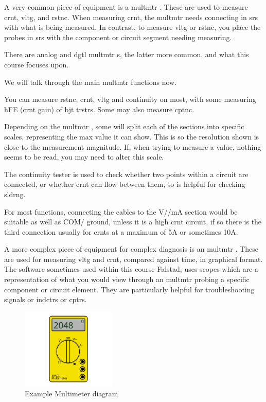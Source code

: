 \documentclass[a4paper,11pt]{report}
\begin{document}
A very common piece of equipment is a \gls{multmtr} . These are used to measure \gls{crnt}, \gls{vltg}, and \gls{rstnc}. When measuring \gls{crnt}, the \gls{multmtr}  needs connecting in \gls{srs} with what is being measured. In contrast, to measure \gls{vltg} or \gls{rstnc}, you place the probes in \gls{srs} with the component or circuit segment needing measuring.

There are analog and \gls{dgtl} \gls{multmtr} s, the latter more common, and what this course focuses upon.

We will talk through the main \gls{multmtr}  functions now.

You can measure \gls{rstnc}, \gls{crnt}, \gls{vltg} and continuity on most, with some measuring hFE (\gls{crnt} gain) of \gls{bjt} \gls{trstr}s. Some may also measure \gls{cptnc}.

Depending on the \gls{multmtr} , some will split each of the sections into specific scales, representing the max value it can show. This is so the resolution shown is close to the measurement magnitude. If, when trying to measure a value, nothing seems to be read, you may need to alter this scale.

The continuity tester is used to check whether two points within a circuit are connected, or whether \gls{crnt} can flow between them, so is helpful for checking \gls{sldrng}.

For most functions, connecting the cables to the V/\ohm/mA section would be suitable as well as COM/ ground, unless it is a high \gls{crnt} circuit, if so there is the third connection usually for \gls{crnt}s at a maximum of 5A or sometimes 10A.

A more complex piece of equipment for complex diagnosis is an  \gls{multmtr} . These are used for measuring \gls{vltg} and \gls{crnt}, compared against time, in graphical format. The software sometimes used within this course Falstad, uses scopes which are a representation of what you would view through an  \gls{multmtr}  probing a specific component or circuit element. They are particularly helpful for troubleshooting signals or \gls{indctr}s or \gls{cptr}s.

\begin{figure}[H]
\centering
\includegraphics[width=0.4\textwidth]{multimeter1}
\caption{Example Multimeter diagram}
\end{figure}
\end{document}
